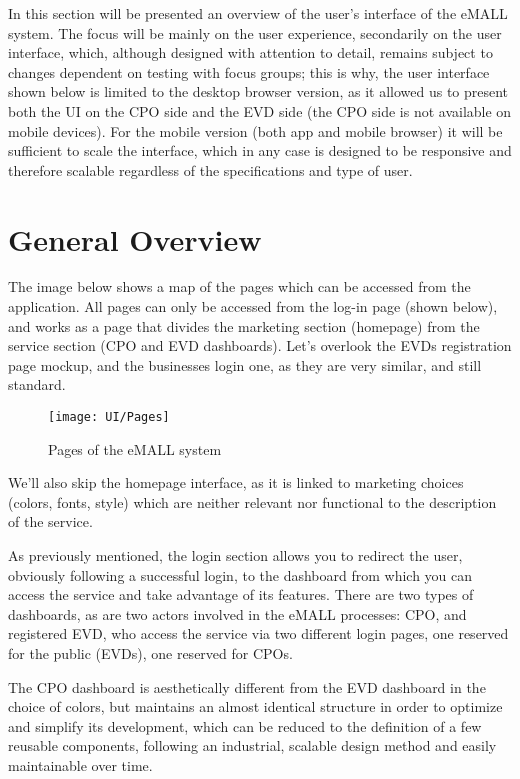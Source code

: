 In this section will be presented an overview of the user’s interface of the eMALL system.
The focus will be mainly on the user experience, secondarily on the user interface, which, although designed with attention to detail, remains subject to changes dependent on testing with focus groups;
this is why, the user interface shown below is limited to the desktop browser version, as it allowed us to present both the UI on the CPO side and the EVD side (the CPO side is not available on mobile devices).
For the mobile version (both app and mobile browser) it will be sufficient to scale the interface, which in any case is designed to be responsive and therefore scalable regardless of the specifications and type of user.


\section{General Overview}
\label{sec: general_overview}%
The image below shows a map of the pages which can be accessed from the application.
All pages can only be accessed from the log-in page (shown below), and works as a page that divides the marketing section (homepage) from the service section (CPO and EVD dashboards).
Let's overlook the EVDs registration page mockup, and the businesses login one, as they are very similar, and still standard.

\begin{figure} [H]
    \begin{center}
        \texttt{[image: UI/Pages]}
        \caption{Pages of the eMALL system}
        \label{fig: pages}
    \end{center}
\end{figure}

We’ll also skip the homepage interface, as it is linked to marketing choices (colors, fonts, style) which are neither relevant nor functional to the description of the service.

As previously mentioned, the login section allows you to redirect the user, obviously following a successful login, to the dashboard from which you can access the service and take advantage of its features.
There are two types of dashboards, as are two actors involved in the eMALL processes: CPO, and registered EVD, who access the service via two different login pages, one reserved for the public (EVDs), one reserved for CPOs.

The CPO dashboard is aesthetically different from the EVD dashboard in the choice of colors, but maintains an almost identical structure in order to optimize and simplify its development, which can be reduced to the definition of a few reusable components, following an industrial, scalable design method and easily maintainable over time.

